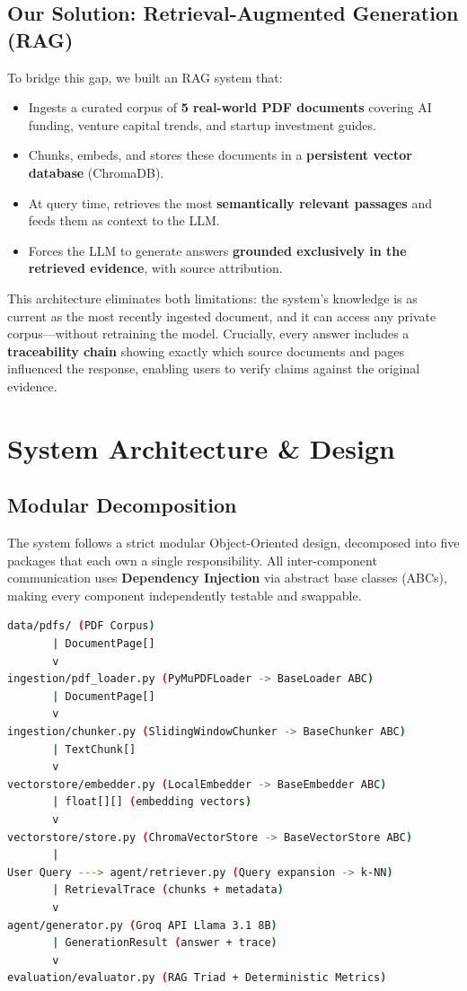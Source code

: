 \documentclass[11pt, a4paper]{article}
\begin{document}
\subsection{Our Solution: Retrieval-Augmented Generation (RAG)}
To bridge this gap, we built an RAG system that:
\begin{itemize}
    \item Ingests a curated corpus of \textbf{5 real-world PDF documents} covering AI funding, venture capital trends, and startup investment guides.
    \item Chunks, embeds, and stores these documents in a \textbf{persistent vector database} (ChromaDB).
    \item At query time, retrieves the most \textbf{semantically relevant passages} and feeds them as context to the LLM.
    \item Forces the LLM to generate answers \textbf{grounded exclusively in the retrieved evidence}, with source attribution.
\end{itemize}

This architecture eliminates both limitations: the system's knowledge is as current as the most recently ingested document, and it can access any private corpus---without retraining the model. Crucially, every answer includes a \textbf{traceability chain} showing exactly which source documents and pages influenced the response, enabling users to verify claims against the original evidence.

\section{System Architecture \& Design}

\subsection{Modular Decomposition}
The system follows a strict modular Object-Oriented design, decomposed into five packages that each own a single responsibility. All inter-component communication uses \textbf{Dependency Injection} via abstract base classes (ABCs), making every component independently testable and swappable.

\begin{lstlisting}[language=bash, caption={System Architecture Data Flow}]
data/pdfs/ (PDF Corpus)
       | DocumentPage[]
       v
ingestion/pdf_loader.py (PyMuPDFLoader -> BaseLoader ABC)
       | DocumentPage[]
       v
ingestion/chunker.py (SlidingWindowChunker -> BaseChunker ABC)
       | TextChunk[]
       v
vectorstore/embedder.py (LocalEmbedder -> BaseEmbedder ABC)
       | float[][] (embedding vectors)
       v
vectorstore/store.py (ChromaVectorStore -> BaseVectorStore ABC)
       |
User Query ---> agent/retriever.py (Query expansion -> k-NN)
       | RetrievalTrace (chunks + metadata)
       v
agent/generator.py (Groq API Llama 3.1 8B)
       | GenerationResult (answer + trace)
       v
evaluation/evaluator.py (RAG Triad + Deterministic Metrics)
\end{lstlisting}
\end{document}

